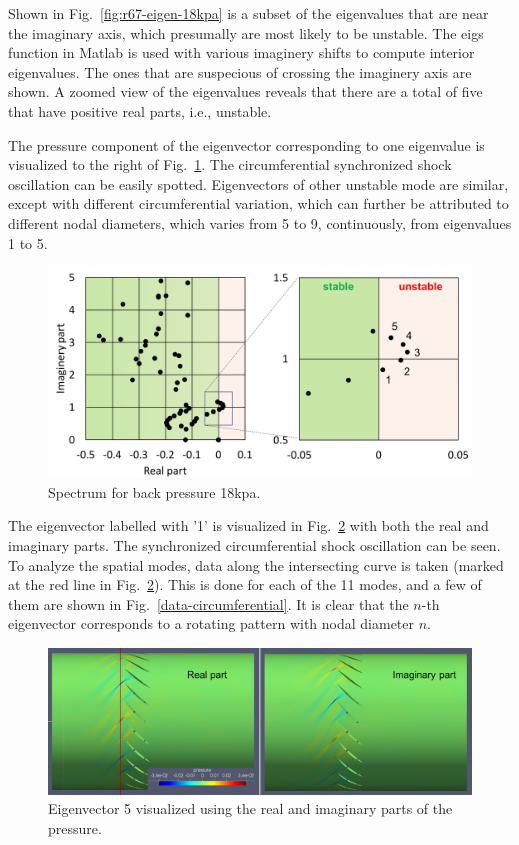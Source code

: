 \documentclass[journal,final]{new-aiaa}
\begin{document}
Shown in Fig.~\ref{fig:r67-eigen-18kpa} is a subset of the eigenvalues
that are near the imaginary axis, which presumally are most likely to
be unstable. The eigs function in Matlab is used with various
imaginery shifts to compute interior eigenvalues. The ones that
are suspecious of crossing the imaginery axis are shown. A zoomed
view of the eigenvalues reveals that there are a total of five that
have positive real parts, i.e., unstable.


The pressure component of the eigenvector corresponding to one
eigenvalue is visualized to the right of Fig.~\ref{fig:r67-eigenvalue-18kpa}. The
circumferential synchronized shock oscillation can be easily spotted.
Eigenvectors of other unstable mode are similar, except with different
circumferential variation, which can further be attributed to different
nodal diameters, which varies from 5 to 9, continuously, from eigenvalues
1 to 5.


\begin{figure}[htb]
	\centering   
	\includegraphics[width=.9\textwidth]{pic/rotor67-2d-eigenvalue-18kpa.png}
	\caption{Spectrum for back pressure 18kpa.}
	\label{fig:r67-eigenvalue-18kpa}
\end{figure}

The eigenvector labelled with '1' is visualized in
Fig.~\ref{fig:r67-eigenvector-18kpa} with both the
real and imaginary parts. The synchronized circumferential shock
oscillation can be seen. To analyze the spatial modes, data along
the intersecting curve is taken (marked at the red line in
Fig.~\ref{fig:r67-eigenvector-18kpa}). This is done for
each of the 11 modes, and a few of them are shown in
Fig.~\ref{data-circumferential}. It is clear that the $n$-th eigenvector
corresponds to a rotating pattern with nodal diameter $n$.

\begin{figure}[htb]
	\centering   
	\includegraphics[width=.9\textwidth]{pic/mode-with-nd5.png}
	\caption{Eigenvector 5 visualized using the real and imaginary parts
		of the pressure.}
	\label{fig:r67-eigenvector-18kpa}
\end{figure}
\end{document}
